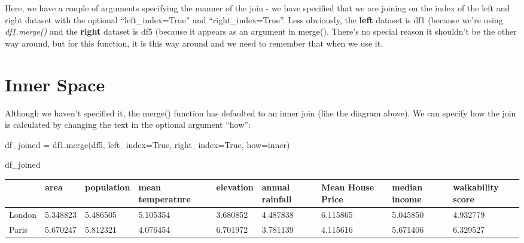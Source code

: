 \documentclass[
  letterpaper,
  DIV=11,
  numbers=noendperiod]{scrreprt}
\newenvironment{Shaded}{\begin{snugshade}}{\end{snugshade}}
\newcommand{\NormalTok}[1]{\textcolor[rgb]{0.00,0.23,0.31}{#1}}
\newcommand{\OperatorTok}[1]{\textcolor[rgb]{0.37,0.37,0.37}{#1}}
\newcommand{\StringTok}[1]{\textcolor[rgb]{0.13,0.47,0.30}{#1}}
\newcommand{\VariableTok}[1]{\textcolor[rgb]{0.07,0.07,0.07}{#1}}
\begin{document}
Here, we have a couple of arguments specifying the manner of the join -
we have specified that we are joining on the index of the left and right
dataset with the optional ``left\_index=True'' and
``right\_index=True''. Less obviously, the \textbf{left} dataset is df1
(because we're using \emph{df1.merge()} and the \textbf{right} dataset
is df5 (because it appears as an argument in merge(). There's no special
reason it shouldn't be the other way around, but for this function, it
is this way around and we need to remember that when we use it.

\hypertarget{inner-space}{%
\section{Inner Space}\label{inner-space}}

Although we haven't specified it, the merge() function has defaulted to
an inner join (like the diagram above). We can specify how the join is
calculated by changing the text in the optional argument ``how'':

\begin{Shaded}
\begin{Highlighting}[]
\NormalTok{df\_joined }\OperatorTok{=}\NormalTok{ df1.merge(df5, left\_index}\OperatorTok{=}\VariableTok{True}\NormalTok{, right\_index}\OperatorTok{=}\VariableTok{True}\NormalTok{, how}\OperatorTok{=}\StringTok{\textquotesingle{}inner\textquotesingle{}}\NormalTok{)}
\end{Highlighting}
\end{Shaded}

\begin{Shaded}
\begin{Highlighting}[]
\NormalTok{df\_joined}
\end{Highlighting}
\end{Shaded}

\begin{longtable}[]{@{}lllllllll@{}}
\toprule()
& area & population & mean temperature & elevation & annual rainfall &
Mean House Price & median income & walkability score \\
\midrule()
\endhead
London & 5.348823 & 5.486505 & 5.105354 & 3.680852 & 4.487838 & 6.115865
& 5.045850 & 4.932779 \\
Paris & 5.670247 & 5.812321 & 4.076454 & 6.701972 & 3.781139 & 4.115616
& 5.671406 & 6.329527 \\
\bottomrule()
\end{longtable}
\end{document}
